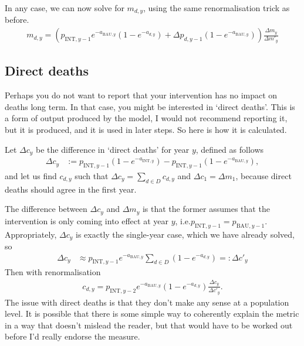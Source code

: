 \documentclass[]{article}
\begin{document}
In any case, we can now solve for  $m_{d, y}$, using the same renormalisation trick as before.
\begin{align*}
	m_{d, y} = \left(p_{\text{INT}, y - 1} e^{-a_{\text{BAU}, y}} \left(1 - e^{-a_{d, y}}\right)
	+ \Delta p_{d, y - 1} \left(1 - e^{-a_{\text{BAU}, y}}\right) \right) \frac{\Delta m_y}{\Delta m'_y} 
\end{align*}

\subsection{Direct deaths}\label{sec:directDeath}

Perhaps you do not want to report that your intervention has no impact on deaths long term. In that case, you might be interested in `direct deaths'. This is a form of output produced by the model, I would not recommend reporting it, but it is produced, and it is used in later steps. So here is how it is calculated.

Let $\Delta c_y$ be the difference in `direct deaths' for year $y$, defined as follows
\begin{align*}
	\Delta c_y &:= p_{\text{INT}, y - 1} \left(1 - e^{-a_{\text{INT}, y}}\right) - p_{\text{INT}, y - 1} \left(1 - e^{-a_{\text{BAU}, y}}\right),
\end{align*}
and let us find $c_{d, y}$ such that $\Delta c_y = \sum_{d \in D} c_{d, y}$ and $\Delta c_1 = \Delta m_1$, because direct deaths should agree in the first year.

The difference between $\Delta c_y$ and $\Delta m_y$ is that the former assumes that the intervention is only coming into effect at year $y$, i.e.\@ $p_{\text{INT}, y-1} = p_{\text{BAU}, y-1}$. Appropriately, $\Delta c_y$ is exactly the single-year case, which we have already solved, so
\begin{align*}
	\Delta c_y &\approx p_{\text{INT}, y-1} e^{-a_{\text{BAU}, y}} \sum_{d \in D} \left(1 - e^{-a_{d, y}}\right) =: \Delta c'_y
\end{align*}
Then with renormalisation
\begin{align*}
	c_{d, y} = p_{\text{INT}, y-2} e^{-a_{\text{BAU}, y}} \left(1 - e^{-a_{d, y}}\right) \frac{\Delta c_y}{\Delta c'_y}.
\end{align*}
The issue with direct deaths is that they don't make any sense at a population level. It is possible that there is some simple way to coherently explain the metric in a way that doesn't mislead the reader, but that would have to be worked out before I'd really endorse the measure.
\end{document}
